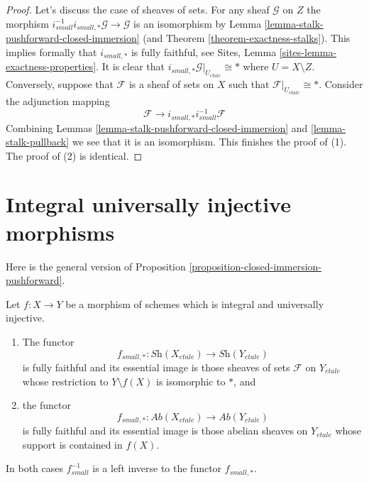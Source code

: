 \begin{proof}
Let's discuss the case of sheaves of sets.
For any sheaf $\mathcal{G}$ on $Z$ the morphism
$i_{small}^{-1}i_{small, *}\mathcal{G} \to \mathcal{G}$
is an isomorphism by
Lemma \ref{lemma-stalk-pushforward-closed-immersion}
(and
Theorem \ref{theorem-exactness-stalks}).
This implies formally that $i_{small, *}$ is fully faithful, see
Sites, Lemma \ref{sites-lemma-exactness-properties}.
It is clear that $i_{small, *}\mathcal{G}|_{U_{etale}} \cong *$
where $U = X \setminus Z$. Conversely, suppose that $\mathcal{F}$
is a sheaf of sets on $X$ such that $\mathcal{F}|_{U_{etale}} \cong *$.
Consider the adjunction mapping
$$
\mathcal{F} \longrightarrow i_{small, *}i_{small}^{-1}\mathcal{F}
$$
Combining
Lemmas \ref{lemma-stalk-pushforward-closed-immersion} and
\ref{lemma-stalk-pullback}
we see that it is an isomorphism. This finishes the proof of (1).
The proof of (2) is identical.
\end{proof}





\section{Integral universally injective morphisms}
\label{section-integral-universally-injective}

\noindent
Here is the general version of
Proposition \ref{proposition-closed-immersion-pushforward}.

\begin{proposition}
\label{proposition-integral-universally-injective-pushforward}
Let $f : X \to Y$ be a morphism of schemes which is integral
and universally injective.
\begin{enumerate}
\item The functor
$$
f_{small, *} :
\textit{Sh}(X_{etale})
\longrightarrow
\textit{Sh}(Y_{etale})
$$
is fully faithful and its essential image is those sheaves of sets
$\mathcal{F}$ on $Y_{etale}$ whose restriction to $Y \setminus f(X)$ is
isomorphic to $*$, and
\item the functor
$$
f_{small, *} :
\textit{Ab}(X_{etale})
\longrightarrow
\textit{Ab}(Y_{etale})
$$
is fully faithful and its essential image is those abelian sheaves on
$Y_{etale}$ whose support is contained in $f(X)$.
\end{enumerate}
In both cases $f_{small}^{-1}$ is a left inverse to the functor
$f_{small, *}$.
\end{proposition}

